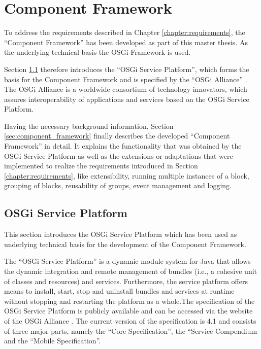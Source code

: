 \chapter{Component Framework}
\label{chapter:osgi}

To address the requirements described in Chapter \ref{chapter:requirements}, the ``Component
Framework'' has been developed as part of this master thesis. As the underlying technical basis the
OSGi Framework is used.

Section \ref{sec:osgi} therefore introduces the ``OSGi Service Platform'', which forms the basis for
the Component Framework and is specified by the ``OSGi Alliance'' \cite{osgi-alliance}. The OSGi
Alliance is a worldwide consortium of technology innovators, which assures interoperability of
applications and services based on the OSGi Service Platform.


Having the necessary background information, Section \ref{sec:component_framework} finally describes
the developed ``Component Framework'' in detail. It explains the functionality that was obtained by
the OSGi Service Platform as well as the extensions or adaptations that were implemented to realize the
requirements introduced in Section \ref{chapter:requirements}, like extensibility, running multiple
instances of a block, grouping of blocks, reusability of groups, event management and logging.

\section{OSGi Service Platform}
\label{sec:osgi}

This section introduces the OSGi Service Platform which has been used as underlying technical basis
for the development of the Component Framework.

The ``OSGi Service Platform'' is a dynamic module system for Java that allows the dynamic integration
and remote management of bundles (i.e., a cohesive unit of classes and resources) and services.
Furthermore, the service platform offers means to install, start, stop and uninstall bundles and
services at runtime without stopping and restarting the platform as a whole.\newline The
specification of the OSGi Service Platform is publicly available and can be accessed via the website
of the OSGi Alliance \cite{osgi-alliance}. The current version of the specification is 4.1 and
consists of three major parts, namely the ``Core Specification'', the ``Service Compendium and the
``Mobile Specification''.

